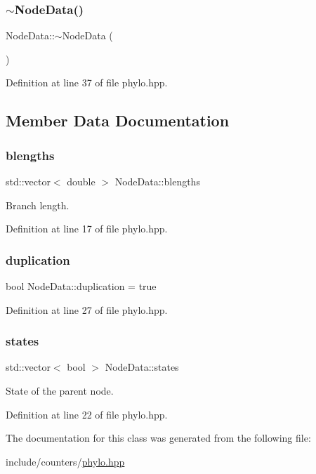 \subsubsection{\texorpdfstring{$\sim$\+Node\+Data()}{~NodeData()}}
{\footnotesize\ttfamily Node\+Data\+::$\sim$\+Node\+Data (\begin{DoxyParamCaption}{ }\end{DoxyParamCaption})\hspace{0.3cm}{\ttfamily [inline]}}



Definition at line 37 of file phylo.\+hpp.



\subsection{Member Data Documentation}
\mbox{\label{class_node_data_a02da5f097c105813216d87ef89ad7bd4}} 
\subsubsection{\texorpdfstring{blengths}{blengths}}
{\footnotesize\ttfamily std\+::vector$<$ double $>$ Node\+Data\+::blengths}

Branch length. 

Definition at line 17 of file phylo.\+hpp.

\mbox{\label{class_node_data_a6c21d52091bb4fa6e3d431856da17caa}} 
\subsubsection{\texorpdfstring{duplication}{duplication}}
{\footnotesize\ttfamily bool Node\+Data\+::duplication = true}



Definition at line 27 of file phylo.\+hpp.

\mbox{\label{class_node_data_a33caaadde6afe892624501bdb0edaea6}} 
\subsubsection{\texorpdfstring{states}{states}}
{\footnotesize\ttfamily std\+::vector$<$ bool $>$ Node\+Data\+::states}

State of the parent node. 

Definition at line 22 of file phylo.\+hpp.



The documentation for this class was generated from the following file\+:\begin{DoxyCompactItemize}
\item 
include/counters/\hyperlink{phylo_8hpp}{phylo.\+hpp}\end{DoxyCompactItemize}

